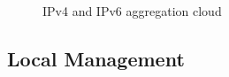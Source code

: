 \begin{figure}
  \begin{minipage}[h]{0.50\textwidth}
    \centering
  \end{minipage}
  \begin{minipage}[h]{0.50\textwidth}
    \centering
  \end{minipage}
\caption{\label{fig:v4-v6-cloud}IPv4 and IPv6 aggregation cloud}
\end{figure}

\subsection{Local Management}
